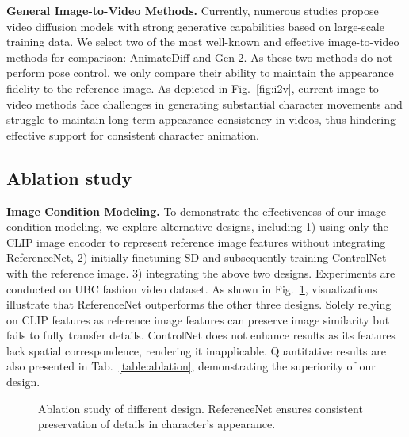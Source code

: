 \noindent
\textbf{General Image-to-Video Methods. }
Currently, numerous studies propose video diffusion models with strong generative capabilities based on large-scale training data. We select two of the most well-known and effective image-to-video methods for comparison: AnimateDiff\cite{animatediff} and Gen-2\cite{gen1}. As these two methods do not perform pose control, we only compare their ability to maintain the appearance fidelity to the reference image. As depicted in Fig.~\ref{fig:i2v}, current image-to-video methods face challenges in generating substantial character movements and struggle to maintain long-term appearance consistency in videos, thus hindering effective support for consistent character animation.

\subsection{Ablation study}\label{ablation}

\noindent
\textbf{Image Condition Modeling. }
To demonstrate the effectiveness of our image condition modeling, we explore alternative designs, including 1) using only the CLIP image encoder to represent reference image features without integrating ReferenceNet, 2) initially finetuning SD and subsequently training ControlNet with the reference image. 3) integrating the above two designs. 
Experiments are conducted on UBC fashion video dataset. 
As shown in Fig.~\ref{fig:ablation}, visualizations illustrate that ReferenceNet outperforms the other three designs. Solely relying on CLIP features as reference image features can preserve image similarity but fails to fully transfer details. ControlNet does not enhance results as its features lack spatial correspondence, rendering it inapplicable. Quantitative results are also presented in Tab.~\ref{table:ablation}, demonstrating the superiority of our design. 

\begin{figure}[!t]
\begin{center}
    \vspace{-0.3cm}
	\setlength{\fboxrule}{0pt}
\end{center}
\vspace{-0.6cm}
\caption{Ablation study of different design. ReferenceNet ensures consistent preservation of details in character's appearance.}
\vspace{-0.2cm}
\label{fig:ablation}
\end{figure}

